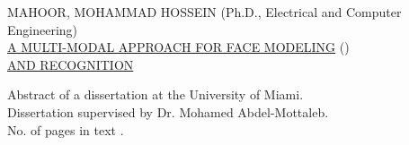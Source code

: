 \newpage
\pagestyle{empty}
\renewcommand{\baselinestretch}{1}
\begin{flushleft}
\small {
MAHOOR, MOHAMMAD HOSSEIN  \hfill (Ph.D., Electrical and Computer Engineering)\\
\underline{A MULTI-MODAL APPROACH FOR FACE MODELING} \hfill (\mydate)\\
\underline{AND RECOGNITION}}

\vspace{0.25in}
Abstract of a dissertation at the University of Miami.\\
\vspace{0.25in}
Dissertation supervised by Dr. Mohamed Abdel-Mottaleb.\\
No. of pages in text \underline{\pageref{LastPage}}.
\end{flushleft}
\renewcommand{\baselinestretch}{2}
